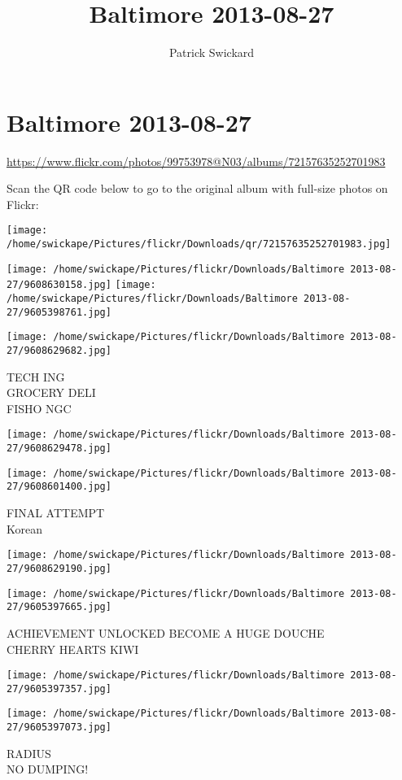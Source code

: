 \documentclass[10pt,letterpaper]{article}
\title{Baltimore 2013-08-27}
\author{Patrick Swickard}
\date{}
\begin{document}
\section*{Baltimore 2013-08-27}

\url{https://www.flickr.com/photos/99753978@N03/albums/72157635252701983}

Scan the QR code below to go to the original album with full-size photos on Flickr:

\texttt{[image: /home/swickape/Pictures/flickr/Downloads/qr/72157635252701983.jpg]}
\pagebreak

\texttt{[image: /home/swickape/Pictures/flickr/Downloads/Baltimore 2013-08-27/9608630158.jpg]}
\texttt{[image: /home/swickape/Pictures/flickr/Downloads/Baltimore 2013-08-27/9605398761.jpg]}

\texttt{[image: /home/swickape/Pictures/flickr/Downloads/Baltimore 2013-08-27/9608629682.jpg]}

TECH ING\\
GROCERY DELI\\
FISHO NGC
\pagebreak

\texttt{[image: /home/swickape/Pictures/flickr/Downloads/Baltimore 2013-08-27/9608629478.jpg]}

\vspace{0.25in}
\texttt{[image: /home/swickape/Pictures/flickr/Downloads/Baltimore 2013-08-27/9608601400.jpg]}

FINAL ATTEMPT\\
Korean
\pagebreak

\texttt{[image: /home/swickape/Pictures/flickr/Downloads/Baltimore 2013-08-27/9608629190.jpg]}

\vspace{0.25in}
\texttt{[image: /home/swickape/Pictures/flickr/Downloads/Baltimore 2013-08-27/9605397665.jpg]}

ACHIEVEMENT UNLOCKED BECOME A HUGE DOUCHE\\
CHERRY HEARTS KIWI
\pagebreak

\texttt{[image: /home/swickape/Pictures/flickr/Downloads/Baltimore 2013-08-27/9605397357.jpg]}

\vspace{0.25in}
\texttt{[image: /home/swickape/Pictures/flickr/Downloads/Baltimore 2013-08-27/9605397073.jpg]}

RADIUS\\
NO DUMPING!
\pagebreak
\end{document}
